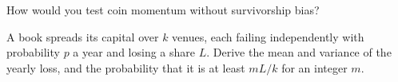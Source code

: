\begin{interviewq}\label{iq:s1:crypto-medium-frequency-strategies:5}
How would you test coin momentum without survivorship bias?
\end{interviewq}

\begin{interviewq}\label{iq:s1:crypto-medium-frequency-strategies:6}
A book spreads its capital over $k$ venues, each failing independently with probability $p$ a year and losing a share $L$. Derive the mean and variance
of the yearly loss, and the probability that it is at least $mL/k$ for an integer $m$.
\end{interviewq}
